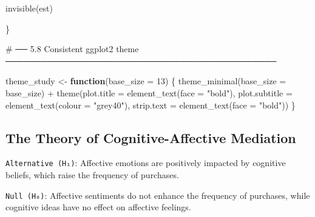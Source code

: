 \documentclass[
  letterpaper,
  DIV=11,
  numbers=noendperiod]{scrartcl}
\newenvironment{Shaded}{\begin{snugshade}}{\end{snugshade}}
\newcommand{\AttributeTok}[1]{\textcolor[rgb]{0.40,0.45,0.13}{#1}}
\newcommand{\CommentTok}[1]{\textcolor[rgb]{0.37,0.37,0.37}{#1}}
\newcommand{\ControlFlowTok}[1]{\textcolor[rgb]{0.00,0.23,0.31}{\textbf{#1}}}
\newcommand{\DecValTok}[1]{\textcolor[rgb]{0.68,0.00,0.00}{#1}}
\newcommand{\FunctionTok}[1]{\textcolor[rgb]{0.28,0.35,0.67}{#1}}
\newcommand{\NormalTok}[1]{\textcolor[rgb]{0.00,0.23,0.31}{#1}}
\newcommand{\OtherTok}[1]{\textcolor[rgb]{0.00,0.23,0.31}{#1}}
\newcommand{\SpecialCharTok}[1]{\textcolor[rgb]{0.37,0.37,0.37}{#1}}
\newcommand{\StringTok}[1]{\textcolor[rgb]{0.13,0.47,0.30}{#1}}
\begin{document}
\begin{Shaded}
\begin{Highlighting}[]
  \FunctionTok{invisible}\NormalTok{(est)}

\NormalTok{\}}

\CommentTok{\# ── 5.8  Consistent ggplot2 theme ─────────────────────────────────────────────}

\NormalTok{theme\_study }\OtherTok{\textless{}{-}} \ControlFlowTok{function}\NormalTok{(}\AttributeTok{base\_size =} \DecValTok{13}\NormalTok{) \{}
  \FunctionTok{theme\_minimal}\NormalTok{(}\AttributeTok{base\_size =}\NormalTok{ base\_size) }\SpecialCharTok{+}
    \FunctionTok{theme}\NormalTok{(}\AttributeTok{plot.title    =} \FunctionTok{element\_text}\NormalTok{(}\AttributeTok{face =} \StringTok{"bold"}\NormalTok{),}
          \AttributeTok{plot.subtitle =} \FunctionTok{element\_text}\NormalTok{(}\AttributeTok{colour =} \StringTok{"grey40"}\NormalTok{),}
          \AttributeTok{strip.text    =} \FunctionTok{element\_text}\NormalTok{(}\AttributeTok{face =} \StringTok{"bold"}\NormalTok{))}
\NormalTok{\}}
\end{Highlighting}
\end{Shaded}

\subsection{\texorpdfstring{\textbf{The Theory of Cognitive-Affective
Mediation}}{The Theory of Cognitive-Affective Mediation}}\label{the-theory-of-cognitive-affective-mediation}

\texttt{Alternative\ (H₁)}: Affective emotions are positively impacted
by cognitive beliefs, which raise the frequency of purchases.

\texttt{Null\ (H₀)}: Affective sentiments do not enhance the frequency
of purchases, while cognitive ideas have no effect on affective
feelings.
\end{document}
